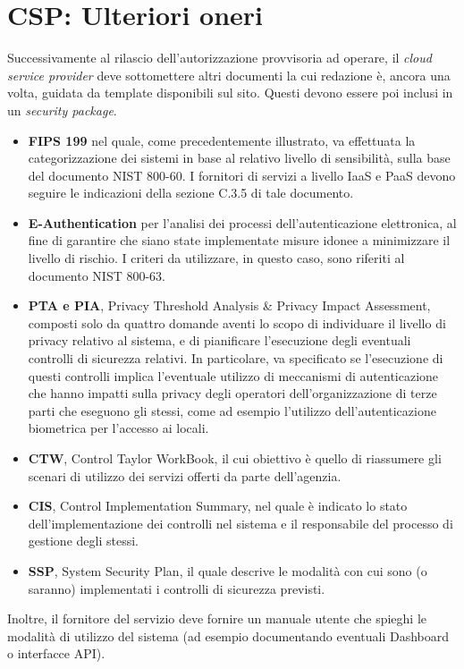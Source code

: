 \documentclass[../main.tex]{subfiles}
\begin{document}
\section{CSP: Ulteriori oneri}
Successivamente al rilascio dell'autorizzazione provvisoria ad operare, il \textit{cloud service provider} deve sottomettere altri documenti la cui redazione è, ancora una volta, guidata da template disponibili sul sito. Questi devono essere poi inclusi in un \textit{security package}.
\begin{itemize}
    \item \textbf{FIPS 199} nel quale, come precedentemente illustrato, va effettuata la categorizzazione dei sistemi in base al relativo livello di sensibilità, sulla base del documento NIST 800-60. I fornitori di servizi a livello IaaS e PaaS devono seguire le indicazioni della sezione C.3.5 di tale documento.
    \item \textbf{E-Authentication} per l'analisi dei processi dell'autenticazione elettronica, al fine di garantire che siano state implementate misure idonee a minimizzare il livello di rischio. I criteri da utilizzare, in questo caso, sono riferiti al documento NIST 800-63.
    \item \textbf{PTA e PIA}, Privacy Threshold Analysis \& Privacy Impact Assessment, composti solo da quattro domande aventi lo scopo di individuare il livello di privacy relativo al sistema, e di pianificare l'esecuzione degli eventuali controlli di sicurezza relativi. In particolare, va specificato se l'esecuzione di questi controlli implica l'eventuale utilizzo di meccanismi di autenticazione che hanno impatti sulla privacy degli operatori dell'organizzazione di terze parti che eseguono gli stessi, come ad esempio l'utilizzo dell'autenticazione biometrica per l'accesso ai locali.
    \item \textbf{CTW}, Control Taylor WorkBook, il cui obiettivo è quello di riassumere gli scenari di utilizzo dei servizi offerti da parte dell'agenzia.
    \item \textbf{CIS}, Control Implementation Summary, nel quale è indicato lo stato dell'implementazione dei controlli nel sistema e il responsabile del processo di gestione degli stessi.
    \item \textbf{SSP}, System Security Plan, il quale descrive le modalità con cui sono (o saranno) implementati i controlli di sicurezza previsti.
\end{itemize}
Inoltre, il fornitore del servizio deve fornire un manuale utente che spieghi le modalità di utilizzo del sistema (ad esempio documentando eventuali Dashboard o interfacce API).
\end{document}

